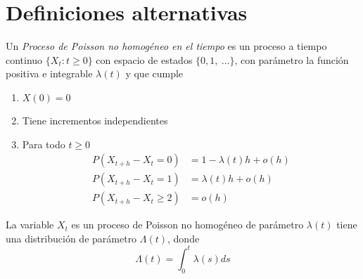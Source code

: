 \documentclass[PREyA.tex]{subfiles}
\begin{document}
\section{Definiciones alternativas}
\begin{defi}
	Un \textit{Proceso de Poisson no homogéneo en el tiempo} es un proceso a tiempo continuo  $\{ X_{t} : t \geq 0 \}$ con espacio de estados $\{ 0,1, \ \dotsc \}$, con parámetro la función positiva e integrable $\lambda(t)$ y que cumple
	\begin{enumerate}
	\item	$X(0)=0$
	\item Tiene incrementos independientes
	
	\item Para todo $t \geq 0$ 
\begin{align*}
P(X_{t+h} - X_{t} =0) &= 1-\lambda(t)h+o(h)\\
P(X_{t+h} - X_{t} =1) &= \lambda(t)h + o(h)\\
P(X_{t+h} - X_{t} \geq 2) &= o(h)
\end{align*}
	\end{enumerate}
\end{defi}

\begin{prop}
	
	La variable $X_{t}$ es un proceso de Poisson no homogéneo de parámetro $\lambda(t)$ tiene una distribución de parámetro $\Lambda(t)$, donde
	$$ \Lambda(t) = \int_{0}^{t} \lambda(s) ds$$	
\end{prop}
\end{document}
